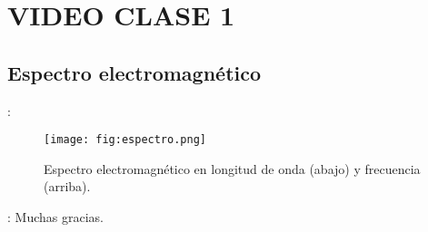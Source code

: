 \section{VIDEO CLASE 1}
\subsection{Espectro electromagnético}
\begin{frame}{\secname : \subsecname}
  \begin{figure}
    \centering
    \texttt{[image: fig:espectro.png]}
    \caption{Espectro electromagnético en longitud de onda (abajo) y frecuencia (arriba).}
    \label{}
  \end{figure}
\end{frame}


\begin{frame}{\secname : \subsecname}
Muchas gracias.
\end{frame}
